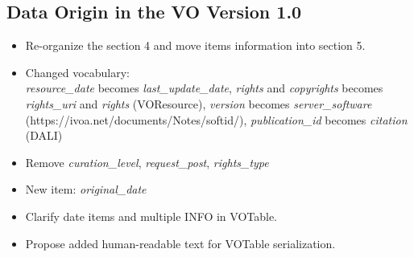\documentclass[11pt,a4paper]{ivoa}
\begin{document}
\subsection{Data Origin in the VO Version 1.0}
\begin{itemize}
\item Re-organize the section 4 and move items information into section 5.
\item Changed vocabulary: \\
  \textit{resource\_date} becomes \textit{last\_update\_date}, 
  \textit{rights} and \textit{copyrights} becomes \textit{rights\_uri} and \textit{rights} (VOResource),
  \textit{version} becomes \textit{server\_software} (https://ivoa.net/documents/Notes/softid/),
  \textit{publication\_id} becomes \textit{citation} (DALI)
\item Remove \textit{curation\_level}, \textit{request\_post}, \textit{rights\_type}
\item New item: \textit{original\_date}
\item Clarify date items and multiple INFO in VOTable.  
\item Propose added human-readable text for VOTable serialization.
\end{itemize}


\end{document}

